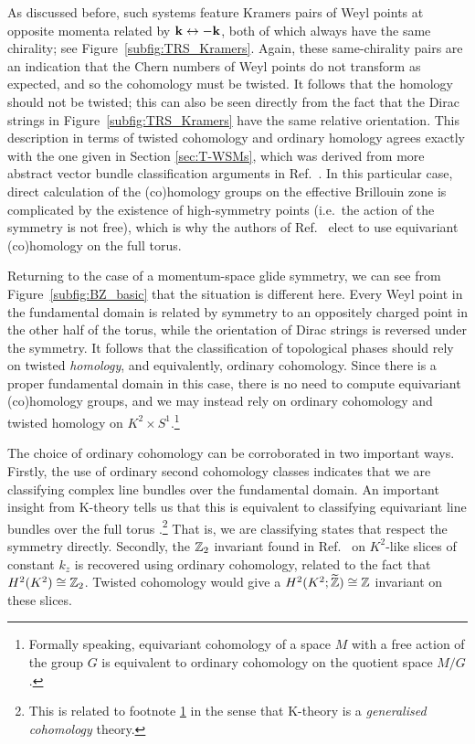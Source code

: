 As discussed before, such systems feature Kramers pairs of Weyl points at opposite momenta related by $\vb{k}\leftrightarrow -\vb{k}$, both of which always have the same chirality; see Figure~\ref{subfig:TRS_Kramers}.
Again, these same-chirality pairs are an indication that the Chern numbers of Weyl points do not transform as expected, and so the cohomology must be twisted. It follows that the homology should not be twisted; this can also be seen directly from the fact that the Dirac strings in Figure~\ref{subfig:TRS_Kramers} have the same relative orientation. This description in terms of twisted cohomology and ordinary homology agrees exactly with the one given in Section \ref{sec:T-WSMs}, which was derived from more abstract vector bundle classification arguments in Ref.~\cite{Thiang_equivariant}. In this particular case, direct calculation of the (co)homology groups on the effective Brillouin zone is complicated by the existence of high-symmetry points (i.e.\ the action of the symmetry is not free), which is why the authors of Ref.~\cite{Thiang_equivariant} elect to use equivariant (co)homology on the full torus.

Returning to the case of a momentum-space glide symmetry, we can see from Figure~\ref{subfig:BZ_basic} that the situation is different here. Every Weyl point in the fundamental domain is related by symmetry to an oppositely charged point in the other half of the torus, while the orientation of Dirac strings is reversed under the symmetry. It follows that the classification of topological phases should rely on twisted \emph{homology}, and equivalently, ordinary cohomology. Since there is a proper fundamental domain in this case, there is no need to compute equivariant (co)homology groups, and we may instead rely on ordinary cohomology and twisted homology on $K^2\times S^1$.\footnote{\label{ft:eq_cohom}
	Formally speaking, equivariant cohomology of a space $M$ with a free action of the group $G$ is equivalent to ordinary cohomology on the quotient space $M/G$ \parencite[Cor. 9.6]{Tu_equivariant}.}

The choice of ordinary cohomology can be corroborated in two important ways. Firstly, the use of ordinary second cohomology classes indicates that we are classifying complex line bundles over the fundamental domain. An important insight from K-theory tells us that this is equivalent to classifying equivariant line bundles over the full torus \parencite[Prop. 2.1]{Segal_K-theory}.\footnote{
	This is related to footnote \ref{ft:eq_cohom} in the sense that K-theory is a \emph{generalised cohomology} theory.}
That is, we are classifying states that respect the symmetry directly. Secondly, the $\mathbb{Z}_2$ invariant found in Ref.~\cite{Fonseca-Vaidya_nonorientable} on $K^2$-like slices of constant $k_z$ is recovered using ordinary cohomology, related to the fact that $H^2(K^2)\cong\mathbb{Z}_2$. Twisted cohomology would give a $H^2(K^2;\widetilde{\mathbb{Z}})\cong\mathbb{Z}$ invariant on these slices.

